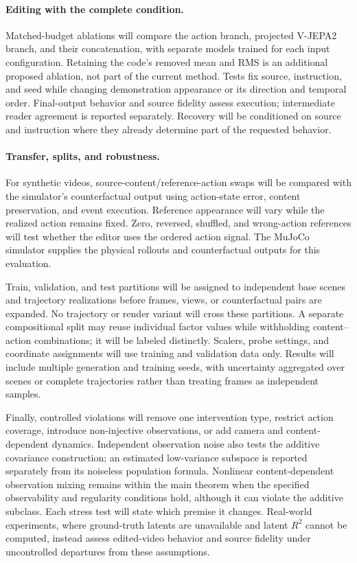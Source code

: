 \paragraph{Editing with the complete condition.}
Matched-budget ablations will compare the action branch, projected V-JEPA2
branch, and their concatenation, with separate models trained for each
input configuration. Retaining the code's removed mean and RMS is an
additional proposed ablation, not part of the current method.
Tests fix source, instruction, and seed while changing demonstration
appearance or its direction and temporal order.
Final-output behavior and source fidelity assess execution; intermediate
reader agreement is reported separately.
Recovery will be conditioned on source and instruction where they
already determine part of the requested behavior.

\paragraph{Transfer, splits, and robustness.}
For synthetic videos, source-content/reference-action swaps will be
compared with the simulator's counterfactual output using action-state
error, content preservation, and event execution. Reference appearance
will vary while the realized action remains fixed.
Zero, reversed, shuffled, and wrong-action references will test whether
the editor uses the ordered action signal. The MuJoCo
simulator supplies the physical rollouts and counterfactual outputs for
this evaluation.

Train, validation, and test partitions will be assigned to independent
base scenes and trajectory realizations before frames, views, or
counterfactual pairs are expanded. No trajectory or render variant
will cross these partitions. A separate compositional split may reuse
individual factor values while withholding content--action
combinations; it will be labeled distinctly.
Scalers, probe settings, and coordinate assignments will use training
and validation data only. Results will include multiple generation and
training seeds, with uncertainty aggregated over scenes or complete
trajectories rather than treating frames as independent samples.

Finally, controlled violations will remove one intervention type,
restrict action coverage, introduce non-injective observations, or add
camera and content-dependent dynamics. Independent observation noise also tests the additive covariance
construction; an estimated low-variance subspace is reported separately
from its noiseless population formula. Nonlinear content-dependent
observation mixing remains within the main theorem when the specified
observability and regularity conditions hold, although it can violate
the additive subclass. Each stress test will state which premise it changes. Real-world
experiments, where ground-truth latents are unavailable and latent
$R^2$ cannot be computed, instead assess edited-video behavior and
source fidelity under uncontrolled departures from these assumptions.

